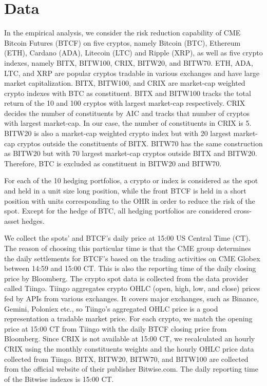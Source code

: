 \section{Data}\label{subsec:data}

\natp{\em [I suggest to merge this with the results part titled ``Empirical results'' with ``.1
  Data''}

In the empirical analysis, we consider the risk reduction capability
of CME Bitcoin Futures (BTCF) on five cryptos, namely Bitcoin (BTC), Ethereum
(ETH), Cardano (ADA), Litecoin (LTC) and Ripple (XRP), as well as five
crypto indexes, namely BITX, BITW100, CRIX, BITW20, and BITW70.
ETH, ADA, LTC, and XRP are popular cryptos tradable in various
exchanges and have large market capitalization. 
BITX, BITW100, and CRIX are market-cap weighted crypto indexes with
BTC as constituent. 
BITX and BITW100 tracks the total return of the 10 and 100 cryptos
with largest market-cap respectively. 
CRIX decides the number of constituents by AIC and tracks that number
of cryptos with largest market-cap. In our case, the number of
constituents in CRIX is 5. 
BITW20 is also a market-cap weighted crypto index but with 20 largest
market-cap cryptos outside the constituents of BITX.
BITW70 has the same construction as BITW20 but with 70 largest
market-cap cryptos outside BITX and BITW20. 
Therefore, BTC is excluded as constituent in BITW20 and BITW70. 

For each of the 10 hedging portfolios, a crypto or index is considered
as the spot and held in a unit size long position, while 
the front BTCF is held in a short position with units corresponding to
the OHR in order to reduce the risk of the spot. 
Except for the hedge of BTC, all hedging portfolios are considered
cross-asset hedges.

We collect the spots' and BTCF's daily price at 15:00 US Central Time
(CT). The reason of choosing this particular time is that the CME
group determines the daily settlements for BTCF's based on the trading
activities on CME Globex between 14:59 and 15:00 CT. This is also the
reporting time of the daily closing price by Bloomberg. 
The crypto spot data is collected from the data provider called
Tiingo.
Tiingo aggregates crypto OHLC (open, high, low, and close) prices fed
by APIs from various exchanges. It covers major exchanges, such as
Binance, Gemini, Poloniex etc., so Tiingo's aggregated OHLC price is a
good representation a tradable market price. 
For each crypto, we match the opening price at 15:00 CT from Tiingo
with the daily BTCF closing price from Bloomberg.
Since CRIX is not available at 15:00 CT, we recalculated an hourly
CRIX using the monthly constituents weights and the hourly OHLC price
data collected from Tiingo. 
BITX, BITW20, BITW70, and BITW100 are collected from the official
website of their publisher Bitwise.com. 
The daily reporting time of the Bitwise indexes is 15:00 CT.

